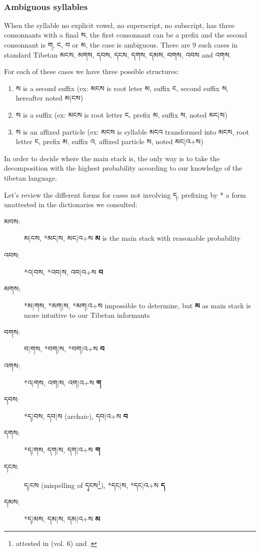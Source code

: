 \documentclass[%
a4paper,%
pagesize,%
12pt,%
parskip=off,%
bibliography=totoc,%
numbers=noenddot,%
DIV=12,%
twoside=semi,%
headings=normal%
]{scrartcl}
\begin{document}
­\subsubsection*{Ambiguous syllables}

When the syllable no explicit vowel, no superscript, no subscript, has three consonnants with a final ས, the first consonnant can be a prefix and the second consonnant is ག, ང, བ or མ, the case is ambiguous. There are 9 such cases in standard Tibetan མངས, མགས, དབས, དངས, དགས, དམས, བགས, འབས and འགས.

For each of these cases we have three possible structures:
\begin{enumerate}
\item ས is a second suffix (ex: མངས is root leter མ, suffix ང, second suffix ས, hereafter noted མ|ངས)
\item ས is a suffix (ex: མངས is root letter ང, prefix མ, suffix ས, noted མང|ས)
\item ས is an affixed particle (ex: མངས is syllable མངའ transformed into མངས, root letter ང, prefix མ, suffix འ, affixed particle ས, noted མང|འ+ས)
\end{enumerate}

In order to decide where the main stack is, the only way is to take the decomposition with the highest probability according to our knowledge of the tibetan language.

Let's review the different forms for cases not involving ད, prefixing by * a form unattested in the dictionaries we consulted:

\begin{description}
\item[མབས:] མ|ངས, *མང|ས, མང|འ+ས \rightarrow{} \textbf{མ} is the main stack with reasonable probability
\item[འབས:] *འ|བས, *འབ|ས, འབ|འ+ས \rightarrow{} \textbf{བ}
\item[མགས:] *མ|གས, *མག|ས, *མག|འ+ས \rightarrow{} impossible to determine, but \textbf{མ} as main stack is more intuitive to our Tibetan informants
\item[བགས:] བ|གས, *བག|ས, *བག|འ+ས \rightarrow{} \textbf{བ}
\item[འགས:] *འ|གས, འག|ས, འག|འ+ས \rightarrow{} \textbf{ག}
\item[དབས:] *ད|བས, དབ|ས (archaic), དབ|འ+ས \rightarrow{} \textbf{བ}
\item[དགས:] *ད|གས, དག|ས, དག|འ+ས \rightarrow{} \textbf{ག}
\item[དངས:] ད|ངས (mispelling of དྭངས\footnote{attested in \cite{NegiDict} (vol. 6) and \cite{Illuminator}.}), *དང|ས, *དང|འ+ས \rightarrow{} \textbf{ད}
\item[དམས:] *ད|མས, དམ|ས, དམ|འ+ས \rightarrow{} \textbf{མ}
\end{description}
\end{document}
